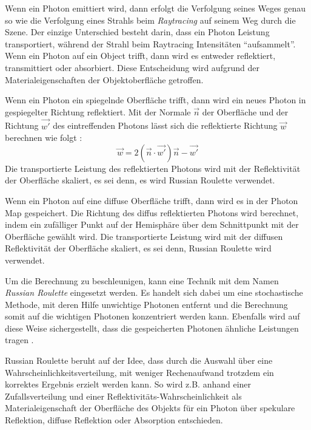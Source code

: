 \documentclass[a4paper,twocolumn,abstracton]{scrartcl}
\begin{document}
Wenn ein Photon emittiert wird, dann erfolgt die Verfolgung seines Weges genau so wie die Verfolgung eines Strahls beim \emph{Raytracing} auf seinem Weg durch die Szene. Der einzige Unterschied besteht darin, dass ein Photon Leistung transportiert, während der Strahl beim Raytracing Intensitäten "`aufsammelt"'. Wenn ein Photon auf ein Object trifft, dann wird es entweder reflektiert, transmittiert oder absorbiert. Diese Entscheidung wird aufgrund der Materialeigenschaften der Objektoberfläche getroffen.

Wenn ein Photon ein spiegelnde Oberfläche trifft, dann wird ein neues Photon in gespiegelter Richtung reflektiert. Mit der Normale $\vec{n}$ der Oberfläche und der Richtung $\vec{w'}$ des eintreffenden Photons lässt sich die reflektierte Richtung $\vec{w}$ berechnen wie folgt \citep{Jensen2001, Shirley2005}:
\begin{displaymath}
\vec{w} = 2(\vec{n} \cdot \vec{w'})\vec{n} - \vec{w'}
\end{displaymath}
Die transportierte Leistung des reflektierten Photons wird mit der Reflektivität der Oberfläche skaliert, es sei denn, es wird Russian Roulette verwendet.

Wenn ein Photon auf eine diffuse Oberfläche trifft, dann wird es in der Photon Map gespeichert. Die Richtung des diffus reflektierten Photons wird berechnet, indem ein zufälliger Punkt auf der Hemisphäre über dem Schnittpunkt mit der Oberfläche gewählt wird. Die transportierte Leistung wird mit der diffusen Reflektivität der Oberfläche skaliert, es sei denn, Russian Roulette wird verwendet.

Um die Berechnung zu beschleunigen, kann eine Technik mit dem Namen \emph{Russian Roulette} eingesetzt werden. Es handelt sich dabei um eine stochastische Methode, mit deren Hilfe unwichtige Photonen entfernt und die Berechnung somit auf die wichtigen Photonen konzentriert werden kann. Ebenfalls wird auf diese Weise sichergestellt, dass die gespeicherten Photonen ähnliche Leistungen tragen \citep{Jensen2001}.

Russian Roulette beruht auf der Idee, dass durch die Auswahl über eine Wahrscheinlichkeitsverteilung, mit weniger Rechenaufwand trotzdem ein korrektes Ergebnis erzielt werden kann. So wird z.B. anhand einer Zufallsverteilung und einer Reflektivitäts-Wahrscheinlichkeit als Materialeigenschaft der Oberfläche des Objekts für ein Photon über spekulare Reflektion, diffuse Reflektion oder Absorption entschieden.
\end{document}
